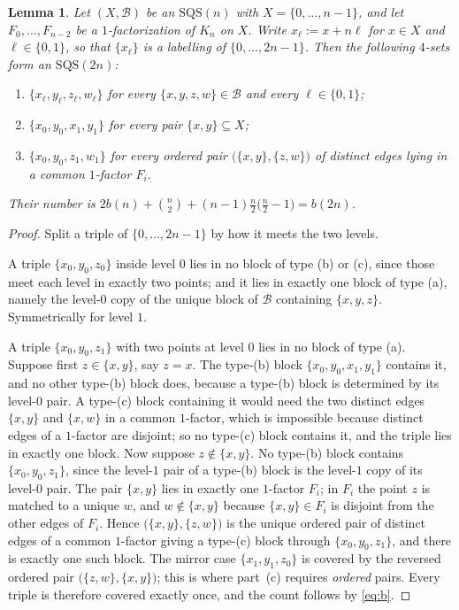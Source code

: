 \documentclass[11pt]{amsart}
\newtheorem{lemma}[theorem]{Lemma}
\newcommand{\SQS}{\mathrm{SQS}}
\begin{document}
\begin{lemma}\label{lem:double}
Let $(X,\mathcal B)$ be an $\SQS(n)$ with $X=\{0,\ldots,n-1\}$, and let
$F_0,\ldots,F_{n-2}$ be a $1$-factorization of $K_n$ on $X$. Write
$x_{\ell}:=x+n\ell$ for $x\in X$ and $\ell\in\{0,1\}$, so that
$\{x_\ell\}$ is a labelling of $\{0,\ldots,2n-1\}$. Then the following
$4$-sets form an $\SQS(2n)$:
\begin{enumerate}
\item[(a)] $\{x_\ell,y_\ell,z_\ell,w_\ell\}$ for every
  $\{x,y,z,w\}\in\mathcal B$ and every $\ell\in\{0,1\}$;
\item[(b)] $\{x_0,y_0,x_1,y_1\}$ for every pair $\{x,y\}\subseteq X$;
\item[(c)] $\{x_0,y_0,z_1,w_1\}$ for every \emph{ordered} pair
  $\bigl(\{x,y\},\{z,w\}\bigr)$ of distinct edges lying in a common $1$-factor
  $F_i$.
\end{enumerate}
Their number is $2b(n)+\binom{n}{2}+(n-1)\tfrac n2\bigl(\tfrac n2-1\bigr)
=b(2n)$.
\end{lemma}

\begin{proof}
Split a triple of $\{0,\ldots,2n-1\}$ by how it meets the two levels.

A triple $\{x_0,y_0,z_0\}$ inside level $0$ lies in no block of type (b) or
(c), since those meet each level in exactly two points; and it lies in exactly
one block of type (a), namely the level-$0$ copy of the unique block of
$\mathcal B$ containing $\{x,y,z\}$. Symmetrically for level $1$.

A triple $\{x_0,y_0,z_1\}$ with two points at level $0$ lies in no block of
type (a). Suppose first $z\in\{x,y\}$, say $z=x$. The type-(b) block
$\{x_0,y_0,x_1,y_1\}$ contains it, and no other type-(b) block does, because a
type-(b) block is determined by its level-$0$ pair. A type-(c) block containing
it would need the two distinct edges $\{x,y\}$ and $\{x,w\}$ in a common
$1$-factor, which is impossible because distinct edges of a $1$-factor are
disjoint; so no type-(c) block contains it, and the triple lies in exactly one
block. Now suppose $z\notin\{x,y\}$. No type-(b) block contains
$\{x_0,y_0,z_1\}$, since the level-$1$ pair of a type-(b) block is the level-$1$
copy of its level-$0$ pair. The pair $\{x,y\}$ lies in exactly one $1$-factor
$F_i$; in $F_i$ the point $z$ is matched to a unique $w$, and $w\notin\{x,y\}$
because $\{x,y\}\in F_i$ is disjoint from the other edges of $F_i$. Hence
$\bigl(\{x,y\},\{z,w\}\bigr)$ is the unique ordered pair of distinct edges of a
common $1$-factor giving a type-(c) block through $\{x_0,y_0,z_1\}$, and there
is exactly one such block. The mirror case $\{x_1,y_1,z_0\}$ is covered by the
reversed ordered pair $\bigl(\{z,w\},\{x,y\}\bigr)$; this is where part~(c)
requires \emph{ordered} pairs. Every triple is therefore covered exactly once,
and the count follows by \eqref{eq:b}.
\end{proof}
\end{document}
